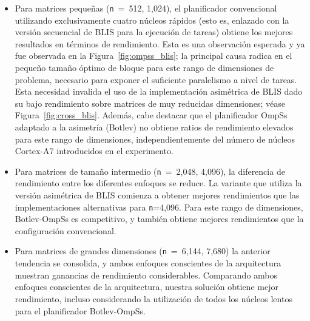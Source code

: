 \begin{itemize}
	\item Para matrices pequeñas ({\tt n}~=~512, 1,024), el planificador convencional utilizando exclusivamente cuatro núcleos rápidos (esto es,
		enlazado con la versión secuencial de BLIS para la ejecución de tareas) obtiene los mejores resultados en términos de rendimiento.
		Esta es una observación esperada y ya fue observada en la Figura~\ref{fig:ompss_blis}; la principal causa radica en el pequeño tamaño óptimo
		de bloque para este rango de dimensiones de problema, necesario para exponer el suficiente paralelismo a nivel de tareas. Esta necesidad invalida
		el uso de la implementación asimétrica de BLIS dado su bajo rendimiento sobre matrices de muy reducidas dimensiones; véase Figura~\ref{fig:cross_blis}. 
		Además, cabe destacar que el planificador OmpSs adaptado a la asimetría (Botlev) no obtiene ratios de rendimiento elevados para este rango de 
		dimensiones, independientemente del número de núcleos Cortex-A7 introducidos en el experimento.

 \item Para matrices de tamaño intermedio ({\tt n}~=~2,048, 4,096), la diferencia de rendimiento entre los diferentes enfoques se reduce.
	 La variante que utiliza la versión asimétrica de BLIS comienza a obtener mejores rendimientos que las implementaciones alternativas para
{\tt n}=4,096. Para este rango de dimensiones, Botlev-OmpSs es competitivo, y también obtiene mejores rendimientos que la configuración convencional.

 \item Para matrices de grandes dimensiones ({\tt n}~=~6,144, 7,680) la anterior tendencia se consolida, y ambos enfoques conscientes de la arquitectura muestran
	 ganancias de rendimiento considerables. Comparando ambos enfoques conscientes de la arquitectura, nuestra solución
obtiene mejor rendimiento, incluso considerando la utilización de todos los núcleos lentos para el planificador Botlev-OmpSs.

\end{itemize}

